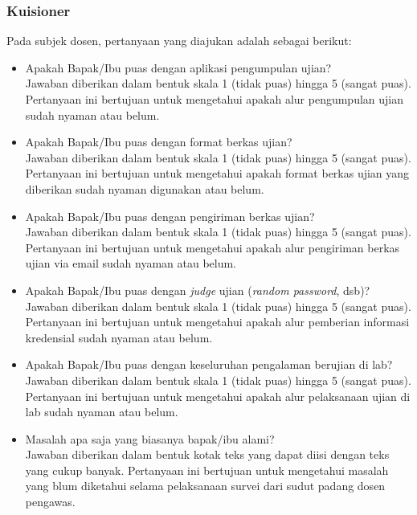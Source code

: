     \subsubsection{Kuisioner}
    Pada subjek dosen, pertanyaan yang diajukan adalah sebagai berikut:
    \begin{itemize}
        \item Apakah Bapak/Ibu puas dengan aplikasi pengumpulan ujian? \\
            Jawaban diberikan dalam bentuk skala 1 (tidak puas) hingga 5 (sangat
            puas). Pertanyaan ini bertujuan untuk mengetahui apakah alur
            pengumpulan ujian sudah nyaman atau belum.
            
        \item Apakah Bapak/Ibu puas dengan format berkas ujian? \\
            Jawaban diberikan dalam bentuk skala 1 (tidak puas) hingga 5 (sangat
            puas). Pertanyaan ini bertujuan untuk mengetahui apakah format
            berkas ujian yang diberikan sudah nyaman digunakan atau belum.
            
        \item Apakah Bapak/Ibu puas dengan pengiriman berkas ujian? \\
            Jawaban diberikan dalam bentuk skala 1 (tidak puas) hingga 5 (sangat
            puas). Pertanyaan ini bertujuan untuk mengetahui apakah alur
            pengiriman berkas ujian via email sudah nyaman atau belum.
            
        \item Apakah Bapak/Ibu puas dengan \textit{judge} ujian (\textit{random
        password}, dsb)? \\
            Jawaban diberikan dalam bentuk skala 1 (tidak puas) hingga 5 (sangat
            puas). Pertanyaan ini bertujuan untuk mengetahui apakah alur
            pemberian informasi kredensial sudah nyaman atau belum.
            
        \item Apakah Bapak/Ibu puas dengan keseluruhan pengalaman berujian di
        lab? \\
            Jawaban diberikan dalam bentuk skala 1 (tidak puas) hingga 5 (sangat
            puas). Pertanyaan ini bertujuan untuk mengetahui apakah alur
            pelaksanaan ujian di lab sudah nyaman atau belum.
            
        \item Masalah apa saja yang biasanya bapak/ibu alami? \\
            Jawaban diberikan dalam bentuk kotak teks yang dapat diisi dengan
            teks yang cukup banyak. Pertanyaan ini bertujuan untuk mengetahui
            masalah yang blum diketahui selama pelaksanaan survei dari sudut
            padang dosen pengawas.
    \end{itemize}

